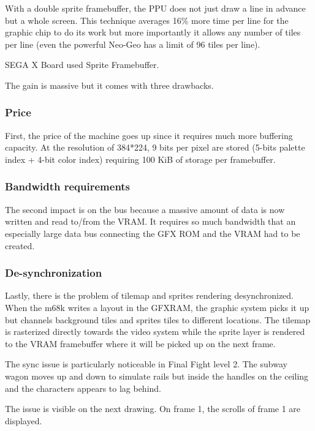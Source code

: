 With a double sprite framebuffer, the PPU does not just draw a line in advance but a whole screen. This technique averages 16\% more time per line for the graphic chip to do its work but more importantly it allows any number of tiles per line (even the powerful Neo-Geo has a limit of 96 tiles per line).

\begin{trivia}
SEGA X Board used Sprite Framebuffer.
\end{trivia}

The gain is massive but it comes with three drawbacks. 

\subsubsection{Price}
First, the price of the machine goes up since it requires much more buffering capacity. At the resolution of 384*224, 9 bits per pixel are stored (5-bits palette index + 4-bit color index) requiring 100 KiB of storage per framebuffer.

\subsubsection{Bandwidth requirements}
The second impact is on the bus because a massive amount of data is now written and read to/from the VRAM. It requires so much bandwidth that an especially large data bus connecting the GFX ROM and the VRAM had to be created.

\subsubsection{De-synchronization}
Lastly, there is the problem of tilemap and sprites rendering desynchronized. When the m68k writes a layout in the GFXRAM, the graphic system picks it up but channels background tiles and sprites tiles to different locations. The tilemap is rasterized directly towards the video system while the sprite layer is rendered to the VRAM framebuffer where it will be picked up on the next frame.
 

\begin{trivia}
The sync issue is particularly noticeable in Final Fight level 2. The subway wagon moves up and down to simulate rails but inside the handles on the ceiling and the characters appears to lag behind.
\end{trivia}

The issue is visible on the next drawing. On frame 1, the scrolls of frame 1 are displayed. 

